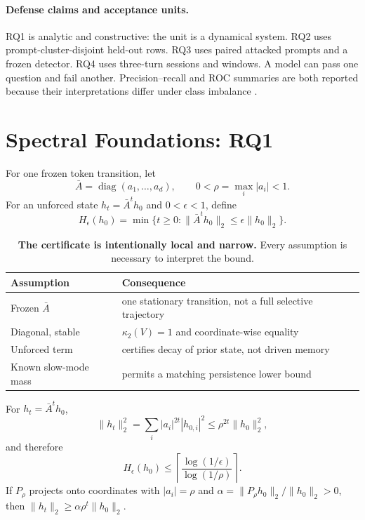 \documentclass[sigconf]{acmart}
\begin{document}
\paragraph{Defense claims and acceptance units.}
RQ1 is analytic and constructive: the unit is a dynamical system. RQ2 uses
prompt-cluster-disjoint held-out rows. RQ3 uses paired attacked prompts and a
frozen detector. RQ4 uses three-turn sessions and windows. A model can pass one
question and fail another. Precision--recall and ROC summaries are both
reported because their interpretations differ under class imbalance
\cite{davis2006prroc}.

\section{Spectral Foundations: RQ1}
For one frozen token transition, let
\begin{equation}
 \bar A=\operatorname{diag}(a_1,\ldots,a_d),\qquad
 0<\rho=\max_i|a_i|<1.
\end{equation}
For an unforced state $h_t=\bar A^t h_0$ and $0<\epsilon<1$, define
\begin{equation}
 H_\epsilon(h_0)=\min\{t\ge0:\|\bar A^t h_0\|_2
 \le\epsilon\|h_0\|_2\}.
\end{equation}

\begin{table}[t]
\caption{\textbf{The certificate is intentionally local and narrow.} Every
assumption is necessary to interpret the bound.}
\label{tab:assumptions}
\centering\small
\begin{tabularx}{\columnwidth}{@{}p{}Y@{}}
\toprule
Assumption & Consequence \\
\midrule
Frozen $\bar A$ & one stationary transition, not a full selective trajectory \\
Diagonal, stable & $\kappa_2(V)=1$ and coordinate-wise equality \\
Unforced term & certifies decay of prior state, not driven memory \\
Known slow-mode mass & permits a matching persistence lower bound \\
\bottomrule
\end{tabularx}
\end{table}

\begin{theorem}
\label{thm:forgetting}
For $h_t=\bar A^t h_0$,
\begin{equation}
 \|h_t\|_2^2=\sum_i |a_i|^{2t}|h_{0,i}|^2
 \le\rho^{2t}\|h_0\|_2^2,
\end{equation}
and therefore
\begin{equation}
 H_\epsilon(h_0)\le
 \left\lceil\frac{\log(1/\epsilon)}{\log(1/\rho)}\right\rceil.
\label{eq:certificate}
\end{equation}
If $P_\rho$ projects onto coordinates with $|a_i|=\rho$
and $\alpha=\|P_\rho h_0\|_2/\|h_0\|_2>0$, then $\|h_t\|_2\ge\alpha\rho^t\|h_0\|_2$.
\end{theorem}
\end{document}
